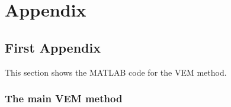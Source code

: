 \chapter{Appendix}

\setcounter{section}{0}                 %
\renewcommand{\thesection}{\Alph{section}} %
\renewcommand{\thesubsection}{\Alph{section}\arabic{subsection}} %
\renewcommand{\thesubsubsection}{\Alph{section}\arabic{subsection}.\arabic{subsubsection}} %

\section{First Appendix}
This section shows the MATLAB code for the VEM method.

\subsection{The main VEM method}

